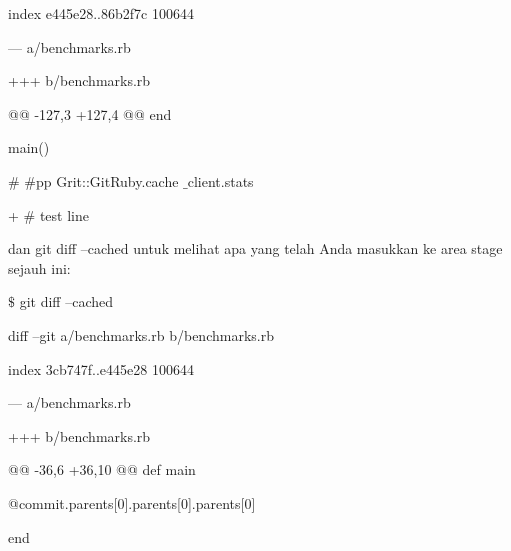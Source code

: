 \noindent 
{\fontsize{14pt}{14pt}\selectfont index e445e28..86b2f7c 100644 \\} \par
\noindent 
{\fontsize{14pt}{14pt}\selectfont --- a/benchmarks.rb \\} \par
\noindent 
{\fontsize{14pt}{14pt}\selectfont +++ b/benchmarks.rb \\} \par
\noindent 
{\fontsize{14pt}{14pt}\selectfont @@ -127,3 +127,4 @@ end \\} \par
\noindent 
{\fontsize{14pt}{14pt}\selectfont main() \\} \par
\vspace{14pt}
\noindent 
{\fontsize{14pt}{14pt}\selectfont  $  \#  $ $  \#  $pp Grit::GitRuby.cache $  \_  $client.stats \\} \par
\noindent 
{\fontsize{14pt}{14pt}\selectfont + $  \#  $ test line \\} \par
\noindent 
{\fontsize{14pt}{14pt}\selectfont dan $  $git diff --cached $  $untuk melihat apa yang telah Anda masukkan ke area stage sejauh ini: \\} \par
\noindent 
{\fontsize{14pt}{14pt}\selectfont  $  \$  $ git diff --cached \\} \par
\noindent 
{\fontsize{14pt}{14pt}\selectfont diff --git a/benchmarks.rb b/benchmarks.rb \\} \par
\noindent 
{\fontsize{14pt}{14pt}\selectfont index 3cb747f..e445e28 100644 \\} \par
\noindent 
{\fontsize{14pt}{14pt}\selectfont --- a/benchmarks.rb \\} \par
\noindent 
{\fontsize{14pt}{14pt}\selectfont +++ b/benchmarks.rb \\} \par
\noindent 
{\fontsize{14pt}{14pt}\selectfont @@ -36,6 +36,10 @@ def main \\} \par
\noindent 
{\fontsize{14pt}{14pt}\selectfont @commit.parents[0].parents[0].parents[0] \\} \par
\noindent 
{\fontsize{14pt}{14pt}\selectfont end \\} \par
